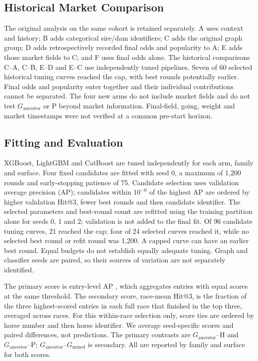 \subsection{Historical Market Comparison}
The original analysis on the same cohort is retained separately. A uses context and history; B adds categorical sire/dam identifiers; C adds the original graph group; D adds retrospectively recorded final odds and popularity to A; E adds those market fields to C; and F uses final odds alone. The historical comparisons C--A, C--B, E--D and E--C use independently tuned pipelines. Seven of 60 selected historical tuning curves reached the cap, with best rounds potentially earlier. Final odds and popularity enter together and their individual contributions cannot be separated. The four new arms do not include market fields and do not test $G_{\mathrm{ancestor}}$ or P beyond market information. Final-field, going, weight and market timestamps were not verified at a common pre-start horizon.

\subsection{Fitting and Evaluation}
XGBoost, LightGBM and CatBoost \cite{chen2016,ke2017,prokhorenkova2018} are tuned independently for each arm, family and surface. Four fixed candidates are fitted with seed 0, a maximum of 1,200 rounds and early-stopping patience of 75. Candidate selection uses validation average precision (AP); candidates within $10^{-6}$ of the highest AP are ordered by higher validation Hit@3, fewer best rounds and then candidate identifier. The selected parameters and best-round count are refitted using the training partition alone for seeds 0, 1 and 2; validation is not added to the final fit. Of 96 candidate tuning curves, 21 reached the cap; four of 24 selected curves reached it, while no selected best round or refit round was 1,200. A capped curve can have an earlier best round. Equal budgets do not establish equally adequate tuning. Graph and classifier seeds are paired, so their sources of variation are not separately identified.

The primary score is entry-level AP \cite{saito2015}, which aggregates entries with equal scores at the same threshold. The secondary score, race-mean Hit@3, is the fraction of the three highest-scored entries in each full race that finished in the top three, averaged across races. For this within-race selection only, score ties are ordered by horse number and then horse identifier. We average seed-specific scores and paired differences, not predictions. The primary contrasts are $G_{\mathrm{ancestor}}$--H and $G_{\mathrm{ancestor}}$--P; $G_{\mathrm{ancestor}}$--$G_{\mathrm{mixed}}$ is secondary. All are reported by family and surface for both scores.

